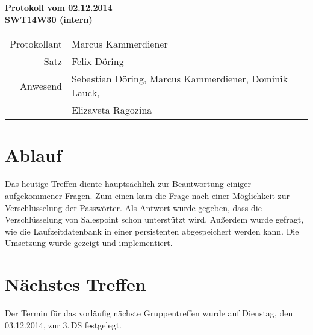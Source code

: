 \documentclass{scrartcl}
\begin{document}
\begin{center}
\LARGE \bf{Protokoll vom 02.12.2014 \\
SWT14W30 (intern)}
\end{center}

\begin{tabular}{rp{10cm}}
Protokollant & Marcus Kammerdiener \\
Satz & Felix Döring \\
Anwesend & Sebastian Döring, Marcus Kammerdiener, Dominik Lauck,\\
& Elizaveta Ragozina \\
\end{tabular}

\vspace*{3em}

\section{Ablauf}
Das heutige Treffen diente hauptsächlich zur Beantwortung einiger aufgekommener Fragen. Zum einen kam die Frage nach einer Möglichkeit zur Verschlüsselung der Passwörter. Als Antwort wurde gegeben, dass die Verschlüsselung von Salespoint schon unterstützt wird. Außerdem wurde gefragt, wie die Laufzeitdatenbank in einer persistenten abgespeichert werden kann. Die Umsetzung wurde gezeigt und implementiert.

\vspace*{1em}

\section{N\"achstes Treffen}
Der Termin für das vorläufig nächste Gruppentreffen wurde auf Dienstag, den 03.12.2014, zur 3.\,DS festgelegt.
\end{document}
